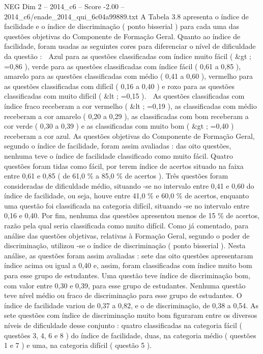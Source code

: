 \begin{textsample}{NEG Dim 2 – 2014\_c6 – Score -2.00 – 2014\_c6/enade\_2014\_qui\_6c04a99889.txt}
A Tabela 3.8 apresenta o índice de facilidade e o índice de discriminação ( ponto bisserial ) para cada uma das questões objetivas do Componente de Formação Geral.
Quanto ao índice de facilidade, foram usadas as seguintes cores para diferenciar o nível de dificuldade da questão :  Azul para as questões classificadas com índice muito fácil ( \&gt ; =0,86 ), verde para as questões classificadas com índice fácil ( 0,61 a 0,85 ), amarelo para as questões classificadas com médio ( 0,41 a 0,60 ), vermelho para as questões classificadas com difícil ( 0,16 a 0,40 ) e roxo para as questões classificadas com muito difícil ( \&lt ; =0,15 ).  As questões classificadas com índice fraco receberam a cor vermelho ( \&lt ; =0,19 ), as classificadas com médio receberam a cor amarelo ( 0,20 a 0,29 ), as classificadas com bom receberam a cor verde ( 0,30 a 0,39 ) e as classificadas com muito bom ( \&gt ; =0,40 ) receberam a cor azul.
As questões objetivas do Componente de Formação Geral, segundo o índice de facilidade, foram assim avaliadas : das oito questões, nenhuma teve o índice de facilidade classificado como muito fácil.
Quatro questões foram tidas como fácil, por terem índice de acertos situado na faixa entre 0,61 e 0,85 ( de 61,0 \% a 85,0 \% de acertos ).
Três questões foram consideradas de dificuldade médio, situando -se no intervalo entre 0,41 e 0,60 do índice de facilidade, ou seja, houve entre 41,0 \% e 60,0 \% de acertos, enquanto uma questão foi classificada na categoria difícil, situando -se no intervalo entre 0,16 e 0,40.
Por fim, nenhuma das questões apresentou menos de 15 \% de acertos, razão pela qual seria classificada como muito difícil.
Como já comentado, para análise das questões objetivas, relativas à Formação Geral, segundo o poder de discriminação, utilizou -se o índice de discriminação ( ponto bisserial ).
Nesta análise, as questões foram assim avaliadas : sete das oito questões apresentaram índice acima ou igual a 0,40 e, assim, foram classificadas com índice muito bom para esse grupo de estudantes.
Uma questão teve índice de discriminação bom, com valor entre 0,30 e 0,39, para esse grupo de estudantes.
Nenhuma questão teve nível médio ou fraco de discriminação para esse grupo de estudantes.
O índice de facilidade variou de 0,37 a 0,82, e o de discriminação, de 0,38 a 0,54.
As sete questões com índice de discriminação muito bom figuraram entre os diversos níveis de dificuldade desse conjunto : quatro classificadas na categoria fácil ( questões 3, 4, 6 e 8 ) do índice de facilidade, duas, na categoria médio ( questões 1 e 7 ) e uma, na categoria difícil ( questão 5 ).

\end{textsample}
